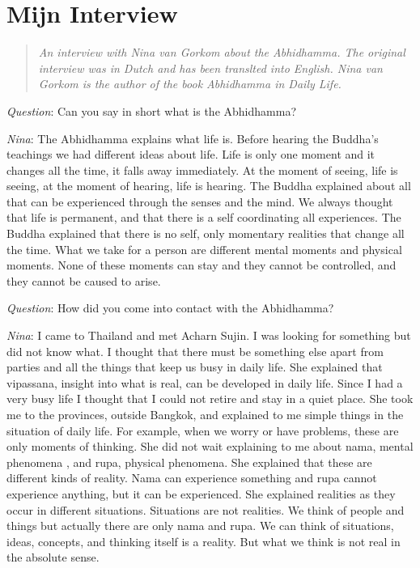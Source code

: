 
\chapter{Mijn Interview}

\begin{quotation}
\textit{An interview with Nina van Gorkom about the Abhidhamma. The original interview was in Dutch and has been translted into English. Nina van Gorkom is the author of the book Abhidhamma in Daily Life.}
\end{quotation}




\textit{Question}: Can you say in short what is the Abhidhamma?



\textit{Nina}: The Abhidhamma explains what life is. Before hearing the Buddha’s teachings we had different ideas about life. Life is only one moment and it changes all the time, it falls away immediately. At the moment of seeing, life is seeing, at the moment of hearing, life is hearing. The Buddha explained about all that can be experienced through the senses and the mind.
We always thought that life is permanent, and that there is a self coordinating all experiences. The Buddha explained that there is no self, only momentary realities that change all the time. What we take for a person are different mental moments and physical moments. None of these moments can stay and they cannot be controlled, and they cannot be caused to arise.


\textit{Question}: How did you come into contact with the Abhidhamma?




\textit{Nina}: I came to Thailand and met Acharn Sujin. I was looking for something but did not know what. I thought that there must be something else apart from parties and all the things that keep us busy in daily life. She explained that vipassana, insight into what is real, can be developed in daily life. Since I had a very busy life I thought that I could not retire and stay in a quiet place. She took me to the provinces, outside Bangkok, and explained to me simple things in the situation of daily life. For example, when we worry or have problems, these are only moments of thinking. She did not wait explaining to me about nama, mental phenomena , and rupa, physical phenomena. She explained that these are different kinds of reality. Nama can experience something and rupa cannot experience anything, but it can be experienced. She explained realities as they occur in different situations. Situations are not realities. We think of people and things but actually there are only nama and rupa. We can think of situations, ideas, concepts, and thinking itself is a reality. But what we think is not real in the absolute sense.




